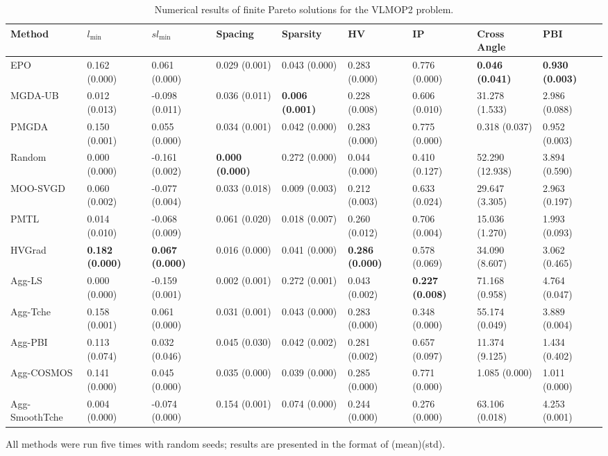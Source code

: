 \begin{table}[ht]
\setlength\tabcolsep{2.0 pt}
\centering
\tiny
\begin{threeparttable}
\caption{Numerical results of finite Pareto solutions for the VLMOP2 problem.}
\label{tab:finite_synthetic}
    \begin{tabular}{l|l|l|l|l|l|l|l|l}
    \toprule
    Method & $l_\mathrm{min}$ & $sl_\mathrm{min}$ & Spacing & Sparsity & HV & IP & Cross Angle & PBI \\
    \midrule
    EPO & 0.162 (0.000) & 0.061 (0.000) & 0.029 (0.001) & 0.043 (0.000) & 0.283 (0.000) & 0.776 (0.000) & \textbf{0.046 (0.041)} & \textbf{0.930 (0.003)} \\
    MGDA-UB & 0.012 (0.013) & -0.098 (0.011) & 0.036 (0.011) & \textbf{0.006 (0.001)} & 0.228 (0.008) & 0.606 (0.010) & 31.278 (1.533) & 2.986 (0.088) \\
    PMGDA & 0.150 (0.001) & 0.055 (0.000) & 0.034 (0.001) & 0.042 (0.000) & 0.283 (0.000) & 0.775 (0.000) & 0.318 (0.037) & 0.952 (0.003) \\
    Random & 0.000 (0.000) & -0.161 (0.002) & \textbf{0.000 (0.000)} & 0.272 (0.000) & 0.044 (0.000) & 0.410 (0.127) & 52.290 (12.938) & 3.894 (0.590) \\
    MOO-SVGD & 0.060 (0.002) & -0.077 (0.004) & 0.033 (0.018) & 0.009 (0.003) & 0.212 (0.003) & 0.633 (0.024) & 29.647 (3.305) & 2.963 (0.197) \\
    PMTL & 0.014 (0.010) & -0.068 (0.009) & 0.061 (0.020) & 0.018 (0.007) & 0.260 (0.012) & 0.706 (0.004) & 15.036 (1.270) & 1.993 (0.093) \\
    HVGrad & \textbf{0.182 (0.000)} & \textbf{0.067 (0.000)} & 0.016 (0.000) & 0.041 (0.000) & \textbf{0.286 (0.000)} & 0.578 (0.069) & 34.090 (8.607) & 3.062 (0.465) \\
    Agg-LS & 0.000 (0.000) & -0.159 (0.001) & 0.002 (0.001) & 0.272 (0.001) & 0.043 (0.002) & \textbf{0.227 (0.008)} & 71.168 (0.958) & 4.764 (0.047) \\
    Agg-Tche & 0.158 (0.001) & 0.061 (0.000) & 0.031 (0.001) & 0.043 (0.000) & 0.283 (0.000) & 0.348 (0.000) & 55.174 (0.049) & 3.889 (0.004) \\
    Agg-PBI & 0.113 (0.074) & 0.032 (0.046) & 0.045 (0.030) & 0.042 (0.002) & 0.281 (0.002) & 0.657 (0.097) & 11.374 (9.125) & 1.434 (0.402) \\
    Agg-COSMOS & 0.141 (0.000) & 0.045 (0.000) & 0.035 (0.000) & 0.039 (0.000) & 0.285 (0.000) & 0.771 (0.000) & 1.085 (0.000) & 1.011 (0.000) \\
    Agg-SmoothTche & 0.004 (0.000) & -0.074 (0.000) & 0.154 (0.001) & 0.074 (0.000) & 0.244 (0.000) & 0.276 (0.000) & 63.106 (0.018) & 4.253 (0.001) \\
    \bottomrule
    \end{tabular}
    \begin{tablenotes}
    \item All methods were run five times with random seeds; results are presented in the format of (mean)(std).
    \end{tablenotes}
\end{threeparttable}
\end{table}

